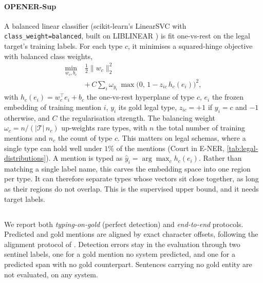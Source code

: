 \paragraph{OPENER-Sup} A balanced linear classifier (scikit-learn's LinearSVC \citep{pedregosa2011scikit} with \texttt{class\_weight=balanced}, built on LIBLINEAR \citep{fan2008liblinear}) is fit one-vs-rest on the legal target's training labels. For each type $c$, it minimises a squared-hinge objective with balanced class weights,
\begin{equation}
\begin{split}
\min_{w_c,b_c}\;&\tfrac12\lVert w_c\rVert_2^2\\
&+\,C\sum_i \omega_{y_i}\,\max\!\big(0,\,1-z_{ic}\,h_c(e_i)\big)^2,
\end{split}
\end{equation}
with $h_c(e_i)=w_c^{\top} e_i+b_c$ the one-vs-rest hyperplane of type $c$, $e_i$ the frozen embedding of training mention $i$, $y_i$ its gold legal type, $z_{ic}={+}1$ if $y_i{=}c$ and ${-}1$ otherwise, and $C$ the regularisation strength. The balancing weight $\omega_c=n/(|\mathcal{T}|\,n_c)$ up-weights rare types, with $n$ the total number of training mentions and $n_c$ the count of type $c$. This matters on legal schemas, where a single type can hold well under $1\%$ of the mentions (Court in E-NER, \autoref{tab:legal-distributions}). A mention is typed as $\hat y_i=\arg\max_c h_c(e_i)$. Rather than matching a single label name, this carves the embedding space into one region per type. It can therefore separate types whose vectors sit close together, as long as their regions do not overlap. This is the supervised upper bound, and it needs target labels. 

\subsection{}
\label{sec:method:evaluation}
We report both \emph{typing-on-gold} (perfect detection) and \emph{end-to-end} protocols. Predicted and gold mentions are aligned by exact character offsets, following the alignment protocol of \citet{genest2025owner}. Detection errors stay in the evaluation through two sentinel labels, one for a gold mention no system predicted, and one for a predicted span with no gold counterpart. Sentences carrying no gold entity are not evaluated, on any system.

